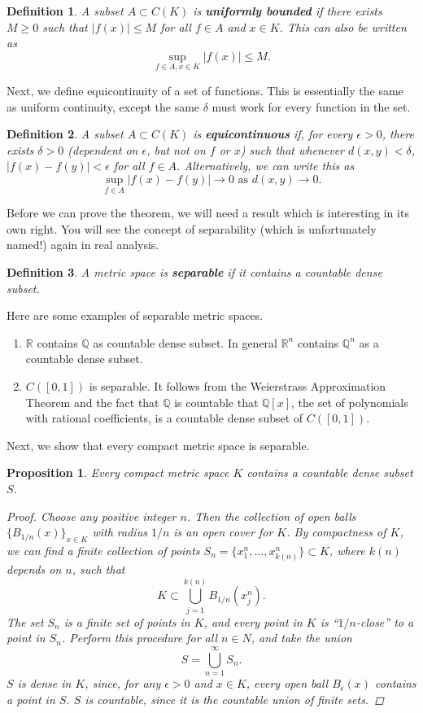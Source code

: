 \documentclass[12pt]{amsart}         %
\newtheorem{definition}{Definition}[section]
\newtheorem{proposition}{Proposition}[section]
\theoremstyle{remark}
\newcommand{\R}{\mathbb{R}}
\newcommand{\Q}{\mathbb{Q}}
\begin{document}
\begin{definition}
A subset $A \subset C(K)$ is \textbf{uniformly bounded} if there exists $M \geq 0$ such that
$|f(x)| \leq M$ for all $f \in A$ and $x \in K$. This can also be written as
\[
\sup_{f \in A, x \in K} |f(x)| \leq M.
\]
\end{definition}

Next, we define equicontinuity of a set of functions. This is essentially the same as uniform continuity, except the same $\delta$ must work for every function in the set.

\begin{definition}
A subset $A \subset C(K)$ is \textbf{equicontinuous} if, for every $\epsilon > 0$, there exists $\delta > 0$ (dependent on $\epsilon$, but not on $f$ or $x$) such that whenever $d(x,y) < \delta$, $|f(x) - f(y)| < \epsilon$ for all $f \in A$. Alternatively, we can write this as
\[
\sup_{f\in A}|f(x) - f(y)| \rightarrow 0 \text{ as } d(x,y) \rightarrow 0.
\]
\end{definition}

Before we can prove the theorem, we will need a result which is interesting in its own right. You will see the concept of separability (which is unfortunately named!) again in real analysis.

\begin{definition}
A metric space is \textbf{separable} if it contains a countable dense subset.
\end{definition}

Here are some examples of separable metric spaces.
\begin{enumerate}
    \item $\R$ contains $\Q$ as countable dense subset. In general $\R^n$ contains $\Q^n$ as a countable dense subset.
    \item $C([0,1])$ is separable. It follows from the Weierstrass Approximation Theorem and the fact that $\Q$ is countable that $\Q[x]$, the set of polynomials with rational coefficients, is a countable dense subset of $C([0,1])$.
\end{enumerate}

Next, we show that every compact metric space is separable.

\begin{proposition}
Every compact metric space $K$ contains a countable dense subset $S$.
\begin{proof}
Choose any positive integer $n$. Then the collection of open balls $\{ B_{1/n}(x)\}_{x \in K}$ with radius $1/n$ is an open cover for $K$. By compactness of $K$, we can find a finite collection of points $S_n = \{x_1^n, \dots, x_{k(n)}^n\} \subset K$, where $k(n)$ depends on $n$, such that
\[
K \subset \bigcup_{j = 1}^{k(n)}B_{1/n}(x_j^n).
\]
The set $S_n$ is a finite set of points in $K$, and every point in $K$ is ``$1/n$-close'' to a point in $S_n$. Perform this procedure for all $n \in N$, and take the union 
\[
S = \bigcup_{n=1}^\infty S_n.
\]
$S$ is dense in $K$, since, for any $\epsilon > 0$ and $x \in K$, every open ball $B_\epsilon(x)$ contains a point in $S$. $S$ is countable, since it is the countable union of finite sets.
\end{proof}
\end{proposition}
\end{document}
